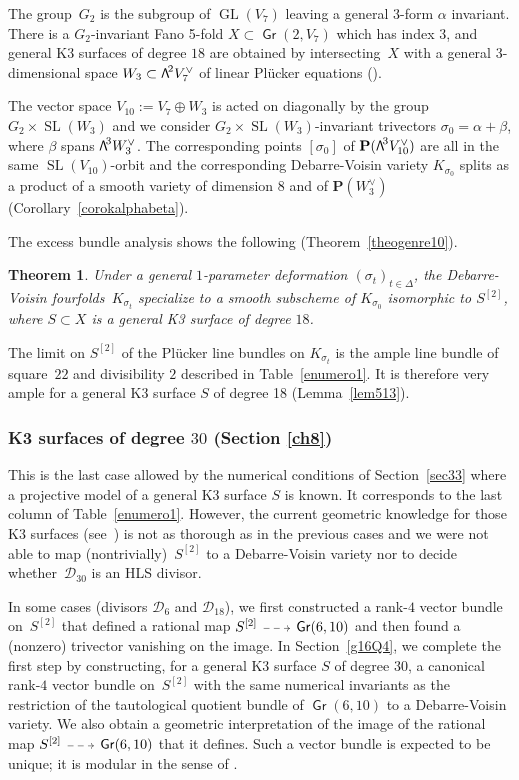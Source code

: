 \documentclass[11pt]{article}
\makeatletter
\let\mathcal\mathscr
\newcommand{\dradpl}{{\!\!\xymatrix@C=8mm{\ar@{-->}[r]&}\!\!}}
\newcommand{\dratst}{{\,\mathrel{\scalebox{.8}{$\dradpl$}}\,}}
\newcommand{\drascst}{{\,\mathrel{\scalebox{.6}{$\dradpl$}}\,}}
\newcommand{\dra}{\mathchoice{\dradpl}{\dratst}{\drascst}{\drascst}}
\newtheorem{theo}[lemm]{Theorem}
\theoremstyle{definition}
\renewcommand\P{{\mathbf P}}\let\PP\P
\newcommand\cD{\mathcal{D}}
\DeclareMathOperator{\Gr}{\mathsf{Gr}}
\let\dual\vee
\DeclareMathOperator{\GL}{GL}
\DeclareMathOperator{\SL}{SL}
\newcommand\bw[1]{{\hbox{\large$\mathsf{\Lambda}$}^{\!#1}}}
\newcommand\hilbS{S^{[2]}}
\renewcommand{\dratst}{\mathrel{\scalebox{.8}{$\dradpl$}}}
\renewcommand{\drascst}{\mathrel{\scalebox{.6}{$\dradpl$}}}
\makeatother
\begin{document}
The group~$G_2$ is the subgroup of $\GL(V_7)$ leaving a general $3$-form $\alpha$ invariant.
There is a $G_2$-invariant Fano 5-fold $X\subset \Gr(2,V_7)$ which has index $3$, and general K3 surfaces of degree $18$ are
obtained by intersecting~$X$ with a general $3$-dimensional space $W_3\subset \bw2V_7^\dual$ of linear Plücker equations (\cite{mukai}).

The vector space $V_{10}:= V_7\oplus W_3$ is acted on diagonally by the group $G_2\times \SL(W_3)$ and {we consider $G_2\times \SL(W_3)$-invariant
trivectors $\sigma_0=\alpha+\beta$, where $\beta$ spans $\bw3W_3^\dual$. The corresponding points $[\sigma_0]$ of $ \P(\bw3V_{10}^\vee)$ are all in the same $\SL(V_{10})$-orbit and the corresponding
Debarre-Voisin variety $K_{\sigma_0}$ splits as a product of a smooth variety of dimension $8$ and of $\P(W_3^\dual)$ (Corollary~\ref{corokalphabeta}).
}

The excess bundle analysis shows the following (Theorem~\ref{theogenre10}).

\begin{theo} \label{theohasgenus10}
Under a general $1$-parameter deformation
$(\sigma_t)_{t\in \Delta}$, the Debarre-Voisin fourfolds~$K_{\sigma_t}$ specialize to a smooth subscheme of $K_{\sigma_0}$ isomorphic
to $\hilbS$, where $S\subset X$ is a general K3 surface of degree $18$.
\end{theo}

The limit on $\hilbS$ of the Plücker line bundles on $K_{\sigma_t}$ is the
ample line bundle of square~$22$ and divisibility $2$
described in Table~\ref{enumero1}.
It is therefore very ample for a general K3 surface $S$ of degree 18 (Lemma~\ref{lem513}).

\subsubsection{K3 surfaces of degree $30$ (Section \ref{ch8})}\label{sec115}
This is the last case allowed by the
numerical conditions of Section~\ref{sec33} where a projective model of a
general K3 surface $S$ is known. It corresponds to the last column of Table~\ref{enumero1}. However, the current geometric knowledge for
those K3 surfaces (see~\cite{mukai2}) is not as thorough as in the previous cases and we were not able to map (nontrivially)~$\hilbS$ to a Debarre-Voisin variety nor to decide whether~$\cD_{30}$ is an HLS divisor.

In some cases (divisors $\cD_6$ and $\cD_{18}$), we first constructed a rank-$4$ vector bundle on~$\hilbS$ that defined a rational map
$\hilbS\dra \Gr(6,10)$ and then found a (nonzero) trivector vanishing on the image. In Section~\ref{g16Q4}, we complete the first step by constructing, for a general K3 surface $S$ of degree $30$, a canonical rank-$4$ vector bundle on~$\hilbS$ with the same
numerical invariants as the restriction of the tautological quotient bundle of
$\Gr(6,10)$ to a Debarre-Voisin variety. We also obtain a geometric
interpretation of the image of the rational map
$\hilbS\dra \Gr(6,10)$ that it defines. Such a vector bundle is expected to be unique; it
is modular in the sense of \cite{ognew}.
\end{document}
